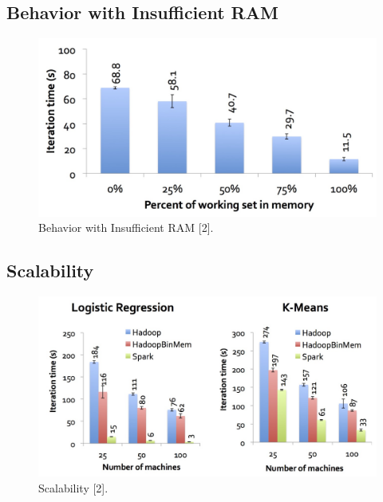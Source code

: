\subsection{Behavior with Insufficient RAM}
\begin{frame}
\begin{figure}
\centering
\includegraphics[width=0.80\linewidth]{figures/result-insufficient-ram.jpg}
\caption{Behavior with Insufficient RAM [2].}
\end{figure}
\end{frame}

\subsection{Scalability}
\begin{frame}
\begin{figure}
\centering
\includegraphics[width=0.80\linewidth]{figures/results-scalability.jpg}
\caption{Scalability [2].}
\end{figure}
\end{frame}
